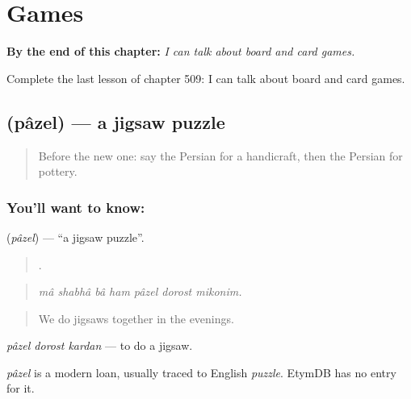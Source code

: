 
\chapter{Games}
\label{ch:fa-games}

\begin{chapteropening}
\textbf{By the end of this chapter:} \emph{I can talk about board and card games.}

Complete the last lesson of chapter 509: I can talk about board and card games.
\end{chapteropening}

\section[\texorpdfstring{\fa{پازل} (pâzel)}{پازل (pâzel)}]{ (pâzel) — a jigsaw puzzle}

\label{lesson:FA-C509-pazel}



\begin{quote}
Before the new one: say the Persian for a handicraft, then the Persian for pottery.
\end{quote}

\subsection*{You'll want to know: }
\textbf{} (\emph{pâzel}) — \textquotedblleft{}a jigsaw puzzle\textquotedblright{}.

\begin{quote}
      .
\end{quote}

\begin{quote}
\emph{mâ shabhâ bâ ham pâzel dorost mikonim.}
\end{quote}

\begin{quote}
We do jigsaws together in the evenings.
\end{quote}

\emph{pâzel dorost kardan} — to do a jigsaw.

\begin{cousinweb}
\emph{pâzel} is a modern loan, usually traced to English \emph{puzzle}. EtymDB has no entry for it.
\end{cousinweb}

